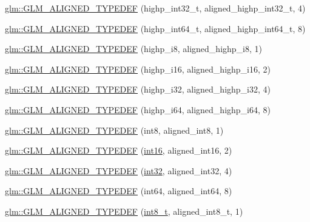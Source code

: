 \begin{DoxyCompactItemize}
\item 
\hyperlink{group__gtx__type__aligned_gaae773c28e6390c6aa76f5b678b7098a3}{glm\+::\+G\+L\+M\+\_\+\+A\+L\+I\+G\+N\+E\+D\+\_\+\+T\+Y\+P\+E\+D\+E\+F} (highp\+\_\+int32\+\_\+t, aligned\+\_\+highp\+\_\+int32\+\_\+t, 4)
\item 
\hyperlink{group__gtx__type__aligned_ga790cfff1ca39d0ed696ffed980809311}{glm\+::\+G\+L\+M\+\_\+\+A\+L\+I\+G\+N\+E\+D\+\_\+\+T\+Y\+P\+E\+D\+E\+F} (highp\+\_\+int64\+\_\+t, aligned\+\_\+highp\+\_\+int64\+\_\+t, 8)
\item 
\hyperlink{group__gtx__type__aligned_ga8265b91eb23c120a9b0c3e381bc37b96}{glm\+::\+G\+L\+M\+\_\+\+A\+L\+I\+G\+N\+E\+D\+\_\+\+T\+Y\+P\+E\+D\+E\+F} (highp\+\_\+i8, aligned\+\_\+highp\+\_\+i8, 1)
\item 
\hyperlink{group__gtx__type__aligned_gae6d384de17588d8edb894fbe06e0d410}{glm\+::\+G\+L\+M\+\_\+\+A\+L\+I\+G\+N\+E\+D\+\_\+\+T\+Y\+P\+E\+D\+E\+F} (highp\+\_\+i16, aligned\+\_\+highp\+\_\+i16, 2)
\item 
\hyperlink{group__gtx__type__aligned_ga9c8172b745ee03fc5b2b91c350c2922f}{glm\+::\+G\+L\+M\+\_\+\+A\+L\+I\+G\+N\+E\+D\+\_\+\+T\+Y\+P\+E\+D\+E\+F} (highp\+\_\+i32, aligned\+\_\+highp\+\_\+i32, 4)
\item 
\hyperlink{group__gtx__type__aligned_ga77e0dff12aa4020ddc3f8cabbea7b2e6}{glm\+::\+G\+L\+M\+\_\+\+A\+L\+I\+G\+N\+E\+D\+\_\+\+T\+Y\+P\+E\+D\+E\+F} (highp\+\_\+i64, aligned\+\_\+highp\+\_\+i64, 8)
\item 
\hyperlink{group__gtx__type__aligned_gabd82b9faa9d4d618dbbe0fc8a1efee63}{glm\+::\+G\+L\+M\+\_\+\+A\+L\+I\+G\+N\+E\+D\+\_\+\+T\+Y\+P\+E\+D\+E\+F} (int8, aligned\+\_\+int8, 1)
\item 
\hyperlink{group__gtx__type__aligned_ga285649744560be21000cfd81bbb5d507}{glm\+::\+G\+L\+M\+\_\+\+A\+L\+I\+G\+N\+E\+D\+\_\+\+T\+Y\+P\+E\+D\+E\+F} (\hyperlink{stb__image_8c_a259fa4834387bd68627ddf37bb3ebdb9}{int16}, aligned\+\_\+int16, 2)
\item 
\hyperlink{group__gtx__type__aligned_ga07732da630b2deda428ce95c0ecaf3ff}{glm\+::\+G\+L\+M\+\_\+\+A\+L\+I\+G\+N\+E\+D\+\_\+\+T\+Y\+P\+E\+D\+E\+F} (\hyperlink{stb__image_8c_a43d43196463bde49cb067f5c20ab8481}{int32}, aligned\+\_\+int32, 4)
\item 
\hyperlink{group__gtx__type__aligned_ga1a8da2a8c51f69c07a2e7f473aa420f4}{glm\+::\+G\+L\+M\+\_\+\+A\+L\+I\+G\+N\+E\+D\+\_\+\+T\+Y\+P\+E\+D\+E\+F} (int64, aligned\+\_\+int64, 8)
\item 
\hyperlink{group__gtx__type__aligned_ga848aedf13e2d9738acf0bb482c590174}{glm\+::\+G\+L\+M\+\_\+\+A\+L\+I\+G\+N\+E\+D\+\_\+\+T\+Y\+P\+E\+D\+E\+F} (\hyperlink{simddefines_8h_aef44329758059c91c76d334e8fc09700}{int8\+\_\+t}, aligned\+\_\+int8\+\_\+t, 1)

\end{DoxyCompactItemize}
